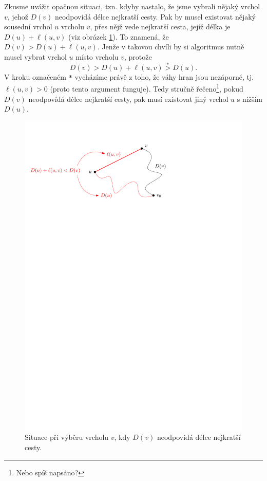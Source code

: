 Zkusme uvážit opačnou situaci, tzn. kdyby nastalo, že jsme vybrali nějaký vrchol $v$, jehož $D(v)$ neodpovídá délce nejkratší cesty. Pak by musel existovat nějaký sousední vrchol $u$ vrcholu $v$, přes nějž vede nejkratší cesta, jejíž délka je $D(u)+\ell(u,v)$ (viz obrázek \ref{fig:dijkstra_vyber_vrcholu}). To znamená, že $D(v)>D(u)+\ell(u,v)$. Jenže v takovou chvíli by si algoritmus nutně musel vybrat vrchol $u$ místo vrcholu $v$, protože
\[D(v)>D(u)+\ell(u,v)\stackrel{\texttt{*}}{>}D(u).\]
V kroku označeném \texttt{*} vycházíme právě z toho, že váhy hran jsou nezáporné, tj. $\ell(u,v)>0$ (proto tento argument funguje). Tedy stručně řečeno\footnote{Nebo spíš napsáno?}, pokud $D(v)$ neodpovídá délce nejkratší cesty, pak musí existovat jiný vrchol $u$ s nižším $D(u)$.
\begin{figure}[h]
    \centering
    \includegraphics[scale=\graphimgsize]{01-grafalgo/images/ch01_dijkstra_vyber_vrcholu.pdf}
    \caption{Situace při výběru vrcholu $v$, kdy $D(v)$ neodpovídá délce nejkratší cesty.}
    \label{fig:dijkstra_vyber_vrcholu}
\end{figure}

